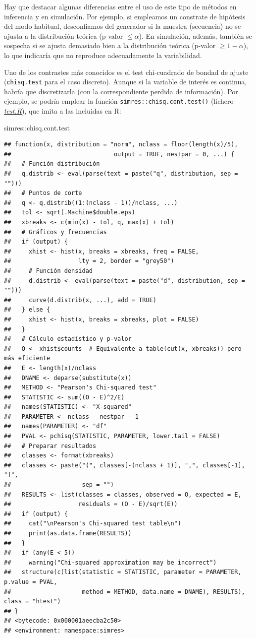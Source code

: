 \documentclass[
]{book}
\newenvironment{Shaded}{\begin{snugshade}}{\end{snugshade}}
\newcommand{\NormalTok}[1]{#1}
\newcommand{\SpecialCharTok}[1]{\textcolor[rgb]{0.00,0.00,0.00}{#1}}
\theoremstyle{break}
\theoremstyle{nonumberplain}
\begin{document}
Hay que destacar algunas diferencias entre el uso de este tipo de métodos en inferencia y en simulación.
Por ejemplo, si empleamos un constrate de hipótesis del modo habitual, desconfiamos del generador si la muestra (secuencia) no se ajusta a la distribución teórica (p-valor \(\leq \alpha\)).
En simulación, además, también se sospecha si se ajusta demasiado bien a la distribución teórica (p-valor \(\geq1-\alpha\)), lo que indicaría que no reproduce adecuadamente la variabilidad.

Uno de los contrastes más conocidos es el test chi-cuadrado de bondad de ajuste (\texttt{chisq.test} para el caso discreto).
Aunque si la variable de interés es continua, habría que discretizarla (con la correspondiente perdida de información).
Por ejemplo, se podría emplear la función \texttt{simres::chisq.cont.test()} (fichero \href{R/test.R}{\emph{test.R}}), que imita a las incluidas en R:

\begin{Shaded}
\begin{Highlighting}[]
\NormalTok{simres}\SpecialCharTok{::}\NormalTok{chisq.cont.test}
\end{Highlighting}
\end{Shaded}

\begin{verbatim}
## function(x, distribution = "norm", nclass = floor(length(x)/5),
##                             output = TRUE, nestpar = 0, ...) {
##   # Función distribución
##   q.distrib <- eval(parse(text = paste("q", distribution, sep = "")))
##   # Puntos de corte
##   q <- q.distrib((1:(nclass - 1))/nclass, ...)
##   tol <- sqrt(.Machine$double.eps)
##   xbreaks <- c(min(x) - tol, q, max(x) + tol)
##   # Gráficos y frecuencias
##   if (output) {
##     xhist <- hist(x, breaks = xbreaks, freq = FALSE,
##                   lty = 2, border = "grey50")
##     # Función densidad
##     d.distrib <- eval(parse(text = paste("d", distribution, sep = "")))
##     curve(d.distrib(x, ...), add = TRUE)
##   } else {
##     xhist <- hist(x, breaks = xbreaks, plot = FALSE)
##   }
##   # Cálculo estadístico y p-valor
##   O <- xhist$counts  # Equivalente a table(cut(x, xbreaks)) pero más eficiente
##   E <- length(x)/nclass
##   DNAME <- deparse(substitute(x))
##   METHOD <- "Pearson's Chi-squared test"
##   STATISTIC <- sum((O - E)^2/E)
##   names(STATISTIC) <- "X-squared"
##   PARAMETER <- nclass - nestpar - 1
##   names(PARAMETER) <- "df"
##   PVAL <- pchisq(STATISTIC, PARAMETER, lower.tail = FALSE)
##   # Preparar resultados
##   classes <- format(xbreaks)
##   classes <- paste("(", classes[-(nclass + 1)], ",", classes[-1], "]",
##                    sep = "")
##   RESULTS <- list(classes = classes, observed = O, expected = E,
##                   residuals = (O - E)/sqrt(E))
##   if (output) {
##     cat("\nPearson's Chi-squared test table\n")
##     print(as.data.frame(RESULTS))
##   }
##   if (any(E < 5))
##     warning("Chi-squared approximation may be incorrect")
##   structure(c(list(statistic = STATISTIC, parameter = PARAMETER, p.value = PVAL,
##                    method = METHOD, data.name = DNAME), RESULTS), class = "htest")
## }
## <bytecode: 0x000001aeecba2c50>
## <environment: namespace:simres>
\end{verbatim}
\end{document}
